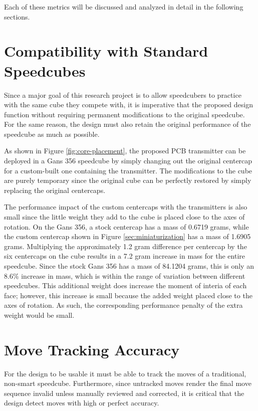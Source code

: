 Each of these metrics will be discussed and analyzed in detail in the
following sections.

\newpage
\section{Compatibility with Standard Speedcubes}
\label{sec:compatibility-with-standard-speedcubes}

Since a major goal of this research project is to allow speedcubers to
practice with the same cube they compete with, it is imperative that
the proposed design function without requiring permanent modifications
to the original speedcube. For the same reason, the design must also
retain the original performance of the speedcube as much as possible.

As shown in Figure \ref{fig:core-placement}, the proposed PCB
transmitter can be deployed in a Gans 356 speedcube by simply changing
out the original centercap for a custom-built one containing the
transmitter. The modifications to the cube are purely temporary since
the original cube can be perfectly restored by simply replacing the
original centercaps.

The performance impact of the custom centercaps with the transmitters
is also small since the little weight they add to the cube is placed
close to the axes of rotation. On the Gans 356, a stock centercap has a
mass of 0.6719 grams, while the custom centercap shown in Figure
\ref{sec:miniaturization} has a mass of 1.6905 grams. Multiplying the
approximately 1.2 gram difference per centercap by the six centercaps
on the cube results in a 7.2 gram increase in mass for the entire
speedcube. Since the stock Gans 356 has a mass of 84.1204 grams, this
is only an 8.6\% increase in mass, which is within the range of
variation between different speedcubes. %
This additional weight does
increase the moment of interia of each face; however, this increase is
small because the added weight placed close to the axes of rotation. As
such, the corresponding performance penalty of the extra weight would
be small.


\section{Move Tracking Accuracy}
\label{sec:move-tracking-accuracy}

For the design to be usable it must be able to track the moves of a
traditional, non-smart speedcube. Furthermore, since untracked moves
render the final move sequence invalid unless manually reviewed and
corrected, it is critical that the design detect moves with high or
perfect accuracy.

